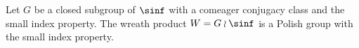 \begin{thm}\label{wr} Let $G$ be a closed subgroup of $\sinf$ with a comeager conjugacy class and the small index property. The wreath product $W=G\wr\sinf$ is a Polish group with the small index property.\end{thm}
